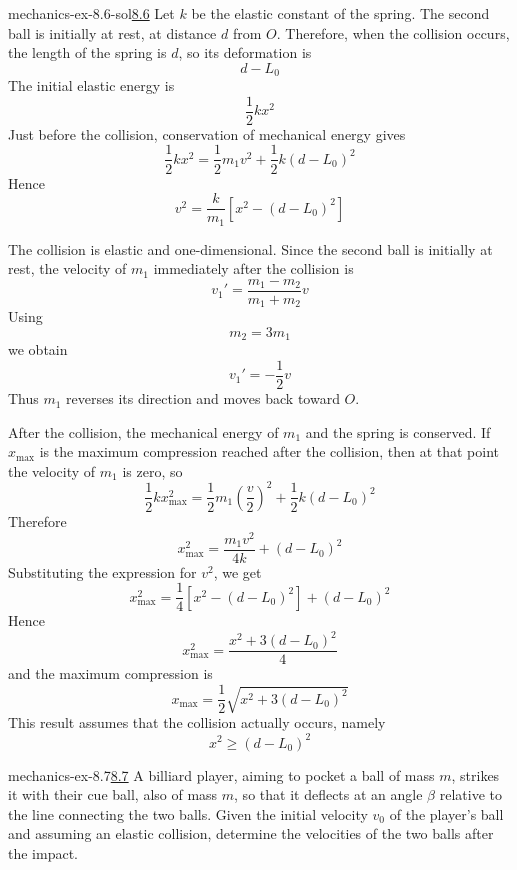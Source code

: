 \documentclass[preview]{standalone}
\begin{document}
\begin{snippetsolution}{mechanics-ex-8.6-sol}{\underline{8.6}}
    Let \(k\) be the elastic constant of the spring. The second ball is initially
    at rest, at distance \(d\) from \(O\). Therefore, when the collision occurs,
    the length of the spring is \(d\), so its deformation is
    \[
        d-L_0
    \]
    The initial elastic energy is
    \[
        \frac{1}{2}kx^2
    \]
    Just before the collision, conservation of mechanical energy gives
    \[
        \frac{1}{2}kx^2
        =
        \frac{1}{2}m_1v^2
        +
        \frac{1}{2}k(d-L_0)^2
    \]
    Hence
    \[
        v^2
        =
        \frac{k}{m_1}
        \left[
            x^2-(d-L_0)^2
        \right]
    \]

    The collision is elastic and one-dimensional. Since the second ball is initially
    at rest, the velocity of \(m_1\) immediately after the collision is
    \[
        v_1'
        =
        \frac{m_1-m_2}{m_1+m_2}v
    \]
    Using
    \[
        m_2 = 3m_1
    \]
    we obtain
    \[
        v_1'
        =
        -\frac{1}{2}v
    \]
    Thus \(m_1\) reverses its direction and moves back toward \(O\).

    After the collision, the mechanical energy of \(m_1\) and the spring is
    conserved. If \(x_{\max}\) is the maximum compression reached after the
    collision, then at that point the velocity of \(m_1\) is zero, so
    \[
        \frac{1}{2}kx_{\max}^2
        =
        \frac{1}{2}m_1\left(\frac{v}{2}\right)^2
        +
        \frac{1}{2}k(d-L_0)^2
    \]
    Therefore
    \[
        x_{\max}^2
        =
        \frac{m_1v^2}{4k}
        +
        (d-L_0)^2
    \]
    Substituting the expression for \(v^2\), we get
    \[
        x_{\max}^2
        =
        \frac{1}{4}
        \left[
            x^2-(d-L_0)^2
        \right]
        +
        (d-L_0)^2
    \]
    Hence
    \[
        x_{\max}^2
        =
        \frac{x^2+3(d-L_0)^2}{4}
    \]
    and the maximum compression is
    \[
        x_{\max}
        =
        \frac{1}{2}
        \sqrt{x^2+3(d-L_0)^2}
    \]
    This result assumes that the collision actually occurs, namely
    \[
        x^2 \geq (d-L_0)^2
    \]
\end{snippetsolution}

\begin{snippetexercise}{mechanics-ex-8.7}{\underline{8.7}}
    A billiard player, aiming to pocket a ball of mass \(m\), strikes it with their cue ball,
    also of mass \(m\), so that it deflects at an angle \(\beta\) relative to the line connecting the
    two balls. Given the initial velocity \(v_0\) of the player's ball and assuming an elastic collision,
    determine the velocities of the two balls after the impact.
\end{snippetexercise}
\end{document}
